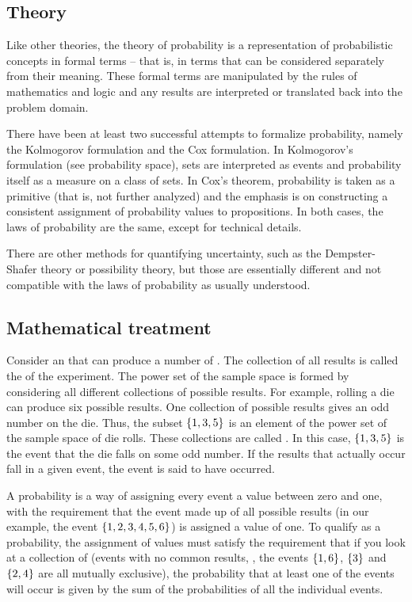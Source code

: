 \subsection{Theory}
Like other theories, the theory of probability is a representation of probabilistic concepts in formal terms -- that is, in terms that can be considered separately from their meaning. These formal terms are manipulated by the rules of mathematics and logic and any results are interpreted or translated back into the problem domain.

There have been at least two successful attempts to formalize probability, namely the Kolmogorov formulation and the Cox formulation. In Kolmogorov's formulation (see probability space), sets are interpreted as events and probability itself as a measure on a class of sets. In Cox's theorem, probability is taken as a primitive (that is, not further analyzed) and the emphasis is on constructing a consistent assignment of probability values to propositions. In both cases, the laws of probability are the same, except for technical details.

There are other methods for quantifying uncertainty, such as the Dempster-Shafer theory or possibility theory, but those are essentially different and not compatible with the laws of probability as usually understood.


\subsection{Mathematical treatment}
Consider an  that can produce a number of . The collection of all results is called the  of the experiment. The power set of the sample space is formed by considering all different collections of possible results. For example, rolling a die can produce six possible results. One collection of possible results gives an odd number on the die. Thus, the subset $\left\lbrace{1,3,5}\right\rbrace$ is an element of the power set of the sample space of die rolls. These collections are called . In this case, $\left\lbrace{1,3,5}\right\rbrace$ is the event that the die falls on some odd number. If the results that actually occur fall in a given event, the event is said to have occurred.

A probability is a way of assigning every event a value between zero and one, with the requirement that the event made up of all possible results (in our example, the event $\left\lbrace{1,2,3,4,5,6}\right\rbrace$) is assigned a value of one. To qualify as a probability, the assignment of values must satisfy the requirement that if you look at a collection of  (events with no common results, \eg, the events $\left\lbrace{1,6}\right\rbrace$, $\left\lbrace{3}\right\rbrace$ and $\left\lbrace{2,4}\right\rbrace$ are all mutually exclusive), the probability that at least one of the events will occur is given by the sum of the probabilities of all the individual events.

